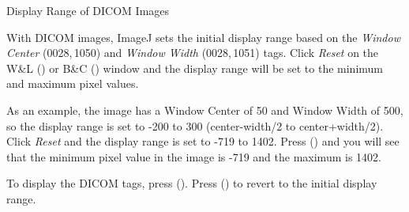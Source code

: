 \begin{infobox}
\caption{\label{infobox:DisplayRangeDICOM}Display Range of DICOM Images}


\noindent {}With DICOM images, ImageJ sets
the initial display range based on the \emph{Window Center} (0028,\,1050)
and \emph{Window Width} (0028,\,1051) tags. Click \emph{Reset} on
the W\&L ()
or B\&C ()
window and the display range will be set to the minimum and maximum
pixel values. \medskip{}


\noindent As an example, the  image has a Window Center of 50 and Window Width of 500, so the display
range is set to -200 to 300 (center-width/2 to center+width/2). Click
\emph{Reset} and the display range is set to -719 to 1402. Press 
()
and you will see that the minimum pixel value in the image is -719
and the maximum is 1402. \medskip{}


\noindent To display the DICOM tags, press 
().
Press  ()
to revert to the initial display range.
\end{infobox}



\subsubsection{\protect{}\label{sub:Window/Level...}}

